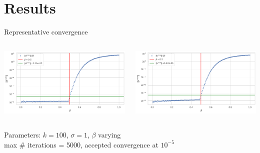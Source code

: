 \documentclass{beamer}
\begin{document}
\section{Results}
\begin{frame}{Representative convergence}
	\begin{minipage}[0.95\textheight]{\textwidth}
	\begin{columns}[T]
	\begin{column}{0.50\textwidth}
	\includegraphics[width=\textwidth, keepaspectratio]{../images/d_conv.png}
	\end{column}
	\begin{column}{0.50\textwidth}
	\includegraphics[width=\textwidth, keepaspectratio]{../images/v_conv.png}
	\end{column}
	\end{columns}
	\end{minipage}
	\begin{center}
		Parameters: $k=100$, $\sigma=1$, $\beta$ varying\\
		max \# iterations = 5000, accepted convergence at $10^{-5}$
	\end{center}
\end{frame}
\end{document}
